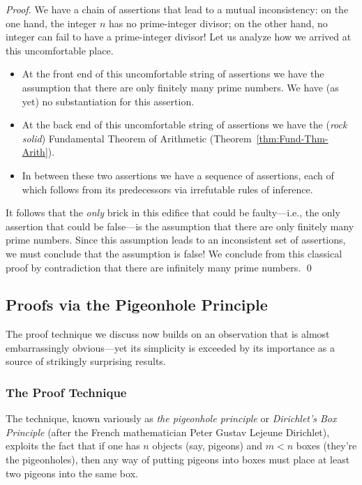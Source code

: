 \begin{proof}
We have a chain of assertions that lead to a mutual inconsistency: on
the one hand, the integer $n$ has no prime-integer divisor; on the
other hand, no integer can fail to have a prime-integer divisor!  Let
us analyze how we arrived at this uncomfortable place.
\begin{itemize}
\item
At the front end of this uncomfortable string of assertions we have
the assumption that there are only finitely many prime numbers.  We
have (as yet) no substantiation for this assertion.
\item
At the back end of this uncomfortable string of assertions we have
the ({\em rock solid}) Fundamental Theorem of Arithmetic
(Theorem~\ref{thm:Fund-Thm-Arith}).
\item
In between these two assertions we have a sequence of assertions, each
of which follows from its predecessors via irrefutable rules of
inference.
\end{itemize}
It follows that the {\em only} brick in this edifice that could be
faulty---i.e., the only assertion that could be false---is the
assumption that there are only finitely many prime numbers.  Since
this assumption leads to an inconsistent set of assertions, we must
conclude that the assumption is false!  We conclude from this
classical proof by contradiction that there are infinitely many prime
numbers.  \qed
\end{proof}


\subsection{Proofs via the Pigeonhole Principle}
\label{sec:pigeonhole}

The proof technique we discuss now builds on an observation that is
almost embarrassingly obvious---yet its simplicity is exceeded by its
importance as a source of strikingly surprising results.

\subsubsection{The Proof Technique}

The technique, known variously as {\it the pigeonhole principle}
or {\it Dirichlet's Box Principle}
(after the French mathematician Peter Gustav Lejeune Dirichlet),
exploits the fact that if one has $n$ objects (say, pigeons) and $m <
n$ boxes (they're the pigeonholes), then any way of putting pigeons
into boxes must place at least two pigeons into the same box.


